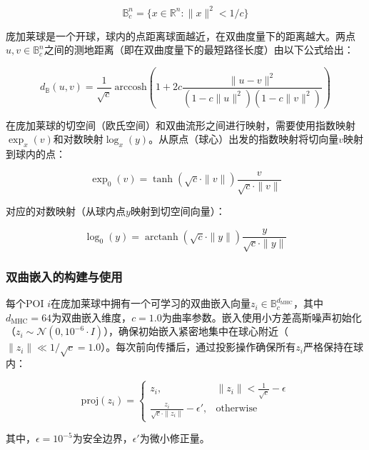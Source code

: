\documentclass[12pt,a4paper]{ctexart}
\begin{document}
\begin{equation}
\mathbb{B}^n_c = \{x\in\mathbb{R}^n : \|x\|^2 < 1/c\}
\label{eq:poincare_def}
\end{equation}

庞加莱球是一个开球，球内的点距离球面越近，在双曲度量下的距离越大。两点$u,v\in\mathbb{B}^n_c$之间的测地距离（即在双曲度量下的最短路径长度）由以下公式给出：

\begin{equation}
d_{\mathbb{B}}(u,v)=\frac{1}{\sqrt{c}}\ \text{arccosh}\!\left(1+2c\frac{\|u-v\|^2}{(1-c\|u\|^2)(1-c\|v\|^2)}\right)
\label{eq:geodesic}
\end{equation}

在庞加莱球的切空间（欧氏空间）和双曲流形之间进行映射，需要使用指数映射$\exp_x(v)$和对数映射$\log_x(y)$。从原点（球心）出发的指数映射将切向量$v$映射到球内的点：

\begin{equation}
\exp_0(v) = \tanh\!\left(\sqrt{c}\cdot\|v\|\right)\frac{v}{\sqrt{c}\cdot\|v\|}
\label{eq:expmap0}
\end{equation}

对应的对数映射（从球内点$y$映射到切空间向量）：

\begin{equation}
\log_0(y) = \operatorname{arctanh}\!\left(\sqrt{c}\cdot\|y\|\right)\frac{y}{\sqrt{c}\cdot\|y\|}
\label{eq:logmap0}
\end{equation}

\subsubsection{双曲嵌入的构建与使用}

每个POI $i$在庞加莱球中拥有一个可学习的双曲嵌入向量$z_i\in\mathbb{B}^{d_{\text{MHC}}}_c$，其中$d_{\text{MHC}}=64$为双曲嵌入维度，$c=1.0$为曲率参数。嵌入使用小方差高斯噪声初始化（$z_i\sim\mathcal{N}(0,10^{-6}\cdot I)$），确保初始嵌入紧密地集中在球心附近（$\|z_i\|\ll 1/\sqrt{c}=1.0$）。每次前向传播后，通过投影操作确保所有$z_i$严格保持在球内：

\begin{equation}
\text{proj}(z_i) = \begin{cases}
z_i, & \|z_i\| < \frac{1}{\sqrt{c}} - \epsilon \\
\frac{z_i}{\sqrt{c}\cdot\|z_i\|} - \epsilon', & \text{otherwise}
\end{cases}
\label{eq:project}
\end{equation}

其中，$\epsilon=10^{-5}$为安全边界，$\epsilon'$为微小修正量。
\end{document}
